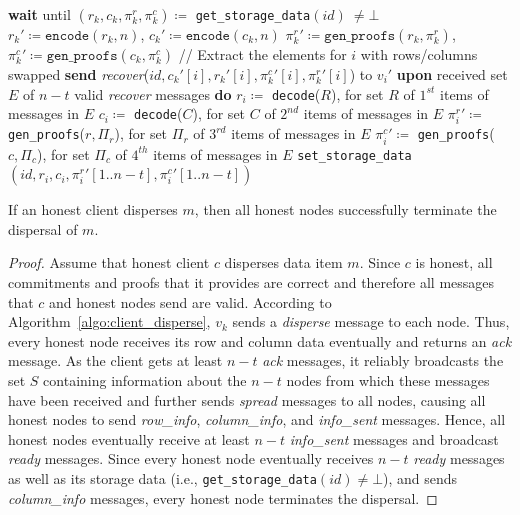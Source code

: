 \documentclass[sigconf,screen]{acmart}
\begin{document}
\begin{algorithm}[t]
\begin{algorithmic}[1]
\small
\caption{Recovery at node $v_k$ for $id$ from $v_i$ to $v_i'$.}
    \label{algo:recover}
\State \textbf{wait} until $(r_k, c_k, \pi^r_k, \pi^c_k) \coloneqq$ \texttt{get\_storage\_data}$(id) ~\neq \bot$
\State $r_k' \coloneqq \texttt{encode}(r_k, n)$, $c_k' \coloneqq \texttt{encode}(c_k, n)$
\State ${\pi^r_k}' \coloneqq \texttt{gen\_proofs}(r_k,{\pi^r_k})$, ${\pi^c_k}' \coloneqq \texttt{gen\_proofs}(c_k, {\pi^c_k})$
\State // Extract the elements for $i$ with rows/columns swapped
\State \textbf{send} \emph{recover}($id, c_k'[i], r_k'[i], {\pi^c_k}'[i], {\pi^r_k}'[i]$) to $v_i'$
\Else
\State \textbf{upon} received set $E$ of $n-t$ valid \emph{recover} messages \textbf{do}
\State $r_i \coloneqq $ \texttt{decode}($R$), for set $R$ of $1^{st}$ items of messages in $E$
\State $c_i \coloneqq $ \texttt{decode}($C$), for set $C$ of $2^{nd}$ items of messages in $E$
\State ${\pi_i^r}' \coloneqq $ \texttt{gen\_proofs}($r, \Pi_r$), for set $\Pi_r$ of $3^{rd}$ items of messages in $E$
\State ${\pi_i^c}' \coloneqq $ \texttt{gen\_proofs}($c, \Pi_c$), for  set $\Pi_c$ of $4^{th}$ items of messages in $E$
\State \texttt{set\_storage\_data}$(id, r_i, c_i, {\pi_i^r}'[1..n-t], {\pi_i^c}'[1..n-t])$
\EndIf
\end{algorithmic}
\end{algorithm}
\begin{lemma}[Termination]\label{lemma:avid_termination} If an honest client disperses $m$, then all honest nodes successfully terminate the dispersal of $m$.
\end{lemma}
\begin{proof}
Assume that honest client $c$ disperses data item $m$. Since $c$ is honest, all commitments and proofs that it provides are correct and therefore all messages that $c$ and honest nodes send are valid.
According to Algorithm~\ref{algo:client_disperse}, $v_k$ sends a \emph{disperse} message to each node. Thus, every honest node receives its row and column data eventually and returns an \emph{ack} message. As the client gets at least $n-t$ \emph{ack} messages, it reliably broadcasts the set $S$ containing information about the $n-t$ nodes from which these messages have been received and further sends \emph{spread} messages to all nodes, causing all honest nodes to send \emph{row\_info}, \emph{column\_info}, and \emph{info\_sent} messages. Hence, all honest nodes eventually receive at least $n-t$ \emph{info\_sent} messages and broadcast \emph{ready} messages.
Since every honest node eventually receives $n-t$ \emph{ready} messages as well as its storage data (i.e., \texttt{get\_storage\_data}$(id) \ne \bot$), and sends \emph{column\_info} messages, every honest node terminates the dispersal.
\end{proof}
\end{document}
